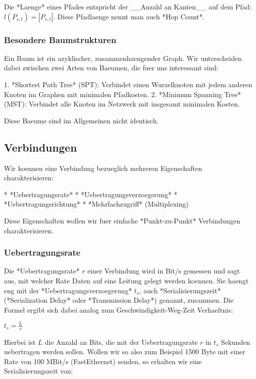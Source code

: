 Die *Laenge* eines Pfades entspricht der \_\_Anzahl an Kanten\_\_ auf dem Pfad:
$l(P_{s,t}) = |P_{s,t}|$. Diese Pfadlaenge nennt man auch *Hop Count*.

\subsubsection{Besondere Baumstrukturen} 

Ein Baum ist ein azyklischer, zusammenhaengender Graph. Wir unterscheiden dabei
zwischen zwei Arten von Baeumen, die fuer uns interessant sind:

1. *Shortest Path Tree* (SPT): Verbindet einen Wurzelknoten mit jedem anderen
   Knoten im Graphen mit minimalen Pfadkosten.
2. *Minimum Spanning Tree* (MST): Verbindet alle Knoten im Netzwerk mit
   insgesamt minimalen Kosten.

Diese Baeume sind im Allgemeinen nicht identisch.

\subsection{Verbindungen} 

Wir koennen eine Verbindung bezueglich mehreren Eigenschaften charakterisieren:

* *Uebertragungsrate*
* *Uebertragungsverzoegerung*
* *Uebertragungsrichtung*
* *Mehrfachzugriff* (Multiplexing)

Diese Eigenschaften wollen wir fuer einfache *Punkt-zu-Punkt* Verbindungen
charakterisieren.

\subsubsection{Uebertragungsrate} 

Die *Uebertragungsrate* $r$ einer Verbindung wird in Bit/s gemessen und sagt
aus, mit welcher Rate Daten auf eine Leitung gelegt werden koennen. Sie haengt
eng mit der *Uebertragungsverzoegerung* $t_s$, auch *Serialisierungszeit*
(*Serialization Delay* oder *Transmission Delay*) genannt, zusammen. Die Formel
ergibt sich dabei analog zum Geschwindigkeit-Weg-Zeit Verhaeltnis:

$t_s = \frac{L}{r}$

Hierbei ist $L$ die Anzahl an Bits, die mit der Uebertragungsrate $r$ in $t_s$
Sekunden uebertragen werden sollen. Wollen wir so also zum Beispiel 1500 Byte
mit einer Rate von 100 MBit/s (FastEthernet) senden, so erhalten wir eine
Serialisierungszeit von:

